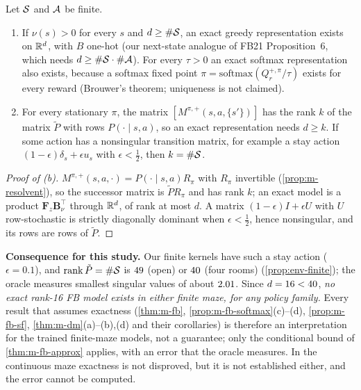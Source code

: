 \begin{proposition}\label{prop:m-fb-rank}
Let $\cS$ and $\cA$ be finite.
\begin{enumerate}[nosep,label=(\alph*)]
\item If $\nu(s)>0$ for every $s$ and $d\ge\#\cS$, an exact greedy representation exists on $\R^d$, with $B$ one-hot (our next-state analogue of FB21 Proposition~6, which needs $d\ge\#\cS\cdot\#\cA$). For every $\tau>0$ an exact softmax representation also exists, because a softmax fixed point $\pi=\mathrm{softmax}(Q^{+,\pi}_r/\tau)$ exists for every reward (Brouwer's theorem; uniqueness is not claimed).
\item For every stationary $\pi$, the matrix $[M^{\pi,+}(s,a,\{s'\})]$ has the rank $k$ of the matrix $\tilde P$ with rows $P(\cdot\mid s,a)$, so an exact representation needs $d\ge k$. If some action has a nonsingular transition matrix, for example a stay action $(1-\epsilon)\delta_s+\epsilon u_s$ with $\epsilon<\frac12$, then $k=\#\cS$.
\end{enumerate}
\end{proposition}
\begin{proof}[Proof of (b)]
$M^{\pi,+}(s,a,\cdot)=P(\cdot\mid s,a)R_\pi$ with $R_\pi$ invertible (\cref{prop:m-resolvent}), so the successor matrix is $\tilde PR_\pi$ and has rank $k$; an exact model is a product $\mathbf F_z\mathbf B_\nu^\top$ through $\R^d$, of rank at most $d$. A matrix $(1-\epsilon)I+\epsilon U$ with $U$ row-stochastic is strictly diagonally dominant when $\epsilon<\frac12$, hence nonsingular, and its rows are rows of $\tilde P$.
\end{proof}

\noindent\textbf{Consequence for this study.}
Our finite kernels have such a stay action ($\epsilon=0.1$), and $\operatorname{rank}\tilde P=\#\cS$ is $\vn{env.rank.open}{49}$ (open) or $\vn{env.rank.4r}{40}$ (four rooms) (\cref{prop:env-finite}); the oracle measures smallest singular values of about $\vn{env.sv}{2.01}$.
Since $d=16<\vn{env.rank.4r}{40}$, \emph{no exact rank-16 FB model exists in either finite maze, for any policy family.}
Every result that assumes exactness (\cref{thm:m-fb}, \cref{prop:m-fb-softmax}(c)--(d), \cref{prop:m-fb-sf}, \cref{thm:m-dm}(a)--(b),(d) and their corollaries) is therefore an interpretation for the trained finite-maze models, not a guarantee; only the conditional bound of \cref{thm:m-fb-approx} applies, with an error that the oracle measures. In the continuous maze exactness is not disproved, but it is not established either, and the error cannot be computed.

